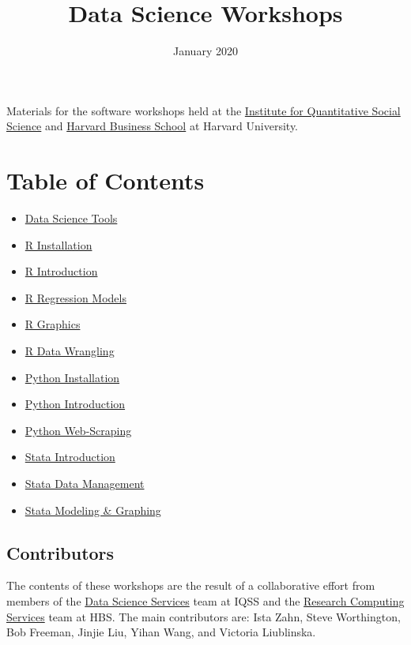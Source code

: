 \documentclass[]{book}
\title{Data Science Workshops}
\author{}
\date{\vspace{-2.5em}January 2020}
\providecommand{\tightlist}{%
  \setlength{\itemsep}{0pt}\setlength{\parskip}{0pt}}
\begin{document}
\maketitle

{
\setcounter{tocdepth}{1}
\tableofcontents
}
Materials for the software workshops held at the
\href{http://dss.iq.harvard.edu/}{Institute for Quantitative Social
Science} and \href{https://training.rcs.hbs.org}{Harvard Business
School} at Harvard University.

\chapter*{Table of Contents}\label{table-of-contents}

\begin{itemize}
\tightlist
\item
  \href{./DataScienceTools.html}{Data Science Tools}
\item
  \href{./Rinstall.html}{R Installation}
\item
  \href{./Rintro.html}{R Introduction}
\item
  \href{./Rmodels.html}{R Regression Models}
\item
  \href{./Rgraphics.html}{R Graphics}
\item
  \href{./RDataWrangling.html}{R Data Wrangling}
\item
  \href{./PythonInstall.html}{Python Installation}
\item
  \href{./PythonIntro.html}{Python Introduction}
\item
  \href{./PythonWebScrape.html}{Python Web-Scraping}
\item
  \href{./StataIntro.html}{Stata Introduction}
\item
  \href{./StataDatMan.html}{Stata Data Management}
\item
  \href{./StataModGraph.html}{Stata Modeling \& Graphing}
\end{itemize}

\section*{Contributors}\label{contributors}

The contents of these workshops are the result of a collaborative effort
from members of the \href{http://dss.iq.harvard.edu}{Data Science
Services} team at IQSS and the
\href{https://training.rcs.hbs.org}{Research Computing Services} team at
HBS. The main contributors are: Ista Zahn, Steve Worthington, Bob
Freeman, Jinjie Liu, Yihan Wang, and Victoria Liublinska.
\end{document}
